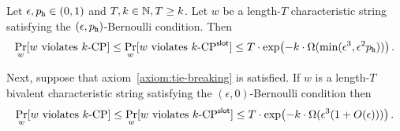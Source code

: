   \begin{theorem} \label{thm:main-CP} Let
    $\epsilon, p_{\mathtt{h}} \in (0,1)$ and $T, k \in \mathbb{N}, T \geq k$. 
    Let $w$ be a length-$T$ characteristic string satisfying the $(\epsilon, p_{\mathtt{h}})$-Bernoulli condition. 
    Then
    $$
      \Pr_{w}[\text{$w$ violates ${k}\text{-}\mathrm{CP}$}] 
        \leq 
      \Pr_{w}[\text{$w$ violates ${k}\text{-}\mathrm{CP}^{\mathsf{slot}}$}] 
        \leq T \cdot 
        \exp\bigl(-k\cdot \Omega(\min(\epsilon^3, \epsilon^2 p_{\mathtt{h}}))\bigr)
        \,.
    $$
    
    Next, suppose that axiom~\ref{axiom:tie-breaking} is satisfied. 
    If $w$ is a length-$T$ bivalent characteristic string satisfying the $(\epsilon, 0)$-Bernoulli condition 
    then
    $$
      \Pr_{w}[\text{$w$ violates ${k}\text{-}\mathrm{CP}$}] 
        \leq 
      \Pr_{w}[\text{$w$ violates ${k}\text{-}\mathrm{CP}^{\mathsf{slot}}$}] 
        \leq T \cdot 
        \exp\bigl(-k \cdot \Omega(\epsilon^3 (1 + O(\epsilon)))\bigr)
        \,.
    $$
  \end{theorem}
